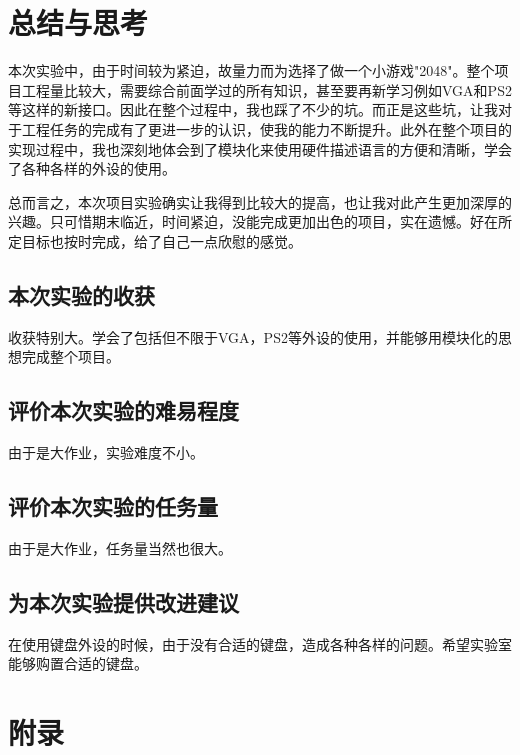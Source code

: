 \documentclass[UTF8]{article}
\begin{document}
	
	\section{总结与思考}	
	本次实验中，由于时间较为紧迫，故量力而为选择了做一个小游戏"2048"。整个项目工程量比较大，需要综合前面学过的所有知识，甚至要再新学习例如VGA和PS2等这样的新接口。因此在整个过程中，我也踩了不少的坑。而正是这些坑，让我对于工程任务的完成有了更进一步的认识，使我的能力不断提升。此外在整个项目的实现过程中，我也深刻地体会到了模块化来使用硬件描述语言的方便和清晰，学会了各种各样的外设的使用。\par
	总而言之，本次项目实验确实让我得到比较大的提高，也让我对此产生更加深厚的兴趣。只可惜期末临近，时间紧迫，没能完成更加出色的项目，实在遗憾。好在所定目标也按时完成，给了自己一点欣慰的感觉。\par
	
	
	\subsection{本次实验的收获}
	收获特别大。学会了包括但不限于VGA，PS2等外设的使用，并能够用模块化的思想完成整个项目。\par
	
	\subsection{评价本次实验的难易程度}
	由于是大作业，实验难度不小。\par
	
	\subsection{评价本次实验的任务量}
	由于是大作业，任务量当然也很大。\par
	
	\subsection{为本次实验提供改进建议}
	在使用键盘外设的时候，由于没有合适的键盘，造成各种各样的问题。希望实验室能够购置合适的键盘。\par
	
	\newpage 
	\section{附录}
\end{document}
